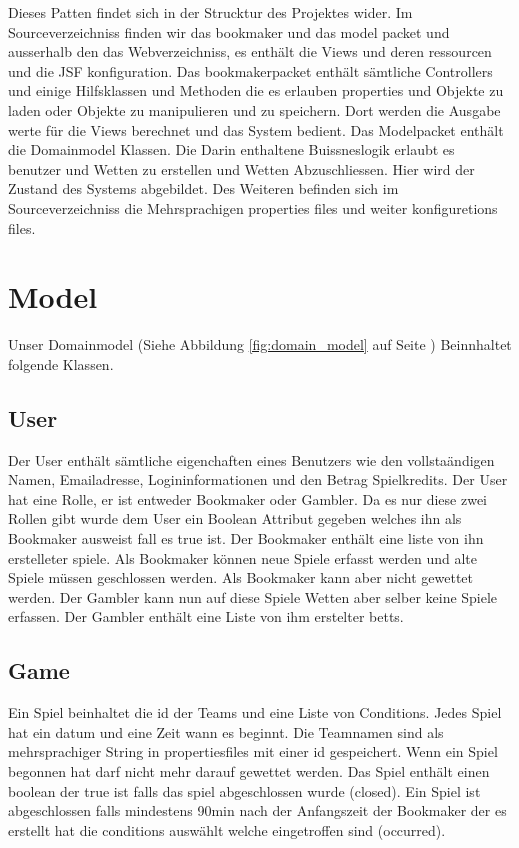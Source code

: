 \documentclass[a4paper, abstracton]{scrartcl}
\begin{document}
  Dieses Patten findet sich in der Strucktur des Projektes wider.
  Im Sourceverzeichniss finden wir das bookmaker und das model packet und
  ausserhalb den das Webverzeichniss, es enthält die Views und deren ressourcen
  und die JSF konfiguration.
  Das bookmakerpacket enthält sämtliche Controllers und einige Hilfsklassen und
  Methoden die es erlauben properties und Objekte zu laden oder Objekte zu
  manipulieren und zu speichern.
  Dort werden die Ausgabe werte für die Views berechnet und das System bedient.
  Das Modelpacket enthält die Domainmodel Klassen. Die Darin enthaltene
  Buissneslogik erlaubt es benutzer und Wetten zu erstellen und Wetten
  Abzuschliessen. Hier wird der Zustand des Systems abgebildet.
  Des Weiteren befinden sich im Sourceverzeichniss die Mehrsprachigen properties
  files und weiter konfiguretions files.
  
\pagebreak

\section{Model}
 
  Unser Domainmodel
  (Siehe Abbildung \ref{fig:domain_model} auf Seite \pageref{fig:domain_model})
  Beinnhaltet folgende Klassen.
  
  \subsection{User}
    Der User enthält sämtliche eigenchaften eines Benutzers wie
    den vollstaändigen Namen, Emailadresse, Logininformationen und den Betrag
    Spielkredits. Der User hat eine Rolle, er ist entweder
    Bookmaker oder Gambler. Da es nur diese zwei Rollen gibt wurde dem User
    ein Boolean Attribut gegeben welches ihn als Bookmaker ausweist fall es
    true ist. Der Bookmaker enthält eine liste von ihn erstelleter spiele.
    Als Bookmaker können neue Spiele erfasst werden und alte Spiele müssen
    geschlossen werden. Als Bookmaker kann aber nicht gewettet werden.
    Der Gambler kann nun auf diese Spiele Wetten aber selber keine Spiele
    erfassen. Der Gambler enthält eine Liste von ihm erstelter betts.
      
  \subsection{Game}
    Ein Spiel beinhaltet die id der Teams und eine Liste von Conditions.
    Jedes Spiel hat ein datum und eine Zeit wann es beginnt.
    Die Teamnamen sind als mehrsprachiger String in propertiesfiles mit einer
    id gespeichert.
    Wenn ein Spiel begonnen hat darf nicht mehr darauf gewettet werden.
    Das Spiel enthält einen boolean der true ist falls das spiel abgeschlossen
    wurde (closed). Ein Spiel ist abgeschlossen falls mindestens 90min nach
    der Anfangszeit der Bookmaker der es erstellt hat die conditions
    auswählt welche eingetroffen sind (occurred).
      
\end{document}
